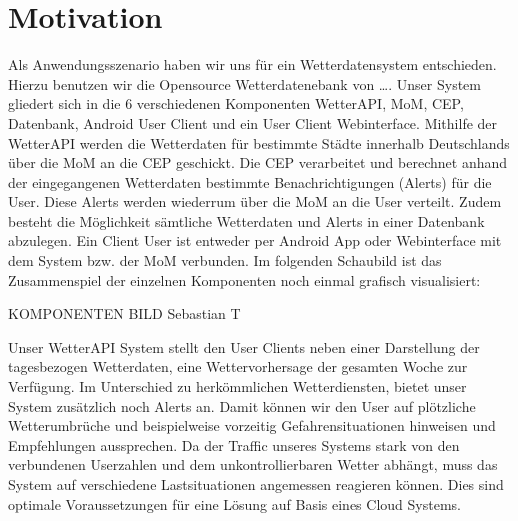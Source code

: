 \section{Motivation}

Als Anwendungsszenario haben wir uns für ein Wetterdatensystem entschieden. Hierzu benutzen wir die Opensource Wetterdatenebank von …. Unser System gliedert sich in die 6 verschiedenen Komponenten WetterAPI, MoM, CEP, Datenbank, Android  User Client und ein User Client Webinterface. Mithilfe der WetterAPI werden die Wetterdaten für bestimmte Städte innerhalb Deutschlands über die MoM an die CEP geschickt. Die CEP verarbeitet und berechnet anhand der eingegangenen Wetterdaten bestimmte Benachrichtigungen (Alerts) für die User. Diese Alerts werden wiederrum über die MoM an die User verteilt.  Zudem besteht die Möglichkeit sämtliche Wetterdaten und Alerts in einer Datenbank abzulegen. Ein Client User ist entweder per Android App oder Webinterface mit dem System bzw. der MoM verbunden.
Im folgenden Schaubild ist das Zusammenspiel der einzelnen Komponenten noch einmal grafisch visualisiert:

KOMPONENTEN BILD Sebastian T

Unser WetterAPI System stellt den User Clients neben einer Darstellung der tagesbezogen Wetterdaten, eine Wettervorhersage der gesamten Woche zur Verfügung. Im Unterschied zu herkömmlichen Wetterdiensten, bietet unser System zusätzlich noch Alerts an. Damit  können wir den User auf plötzliche Wetterumbrüche und beispielweise vorzeitig Gefahrensituationen hinweisen und Empfehlungen aussprechen. 
Da der Traffic unseres Systems stark von den verbundenen Userzahlen und dem unkontrollierbaren Wetter abhängt, muss  das System auf verschiedene Lastsituationen angemessen reagieren können. Dies sind optimale Voraussetzungen für eine Lösung auf Basis eines Cloud Systems.




